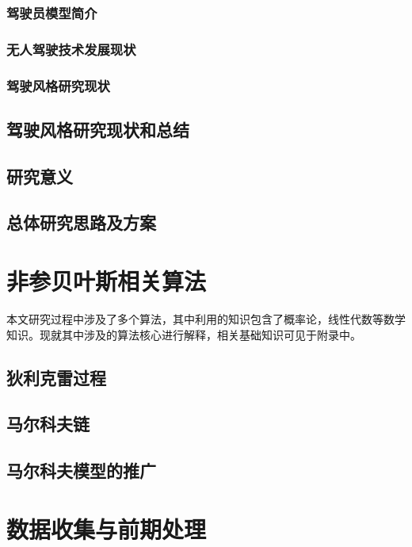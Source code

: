 \documentclass[a4paper,twoside]{article}
\theoremstyle{definition} \newtheorem{law}[thm]{Law}
\theoremstyle{plain} \newtheorem{jury}[thm]{Jury}
\theoremstyle{remark} \newtheorem*{marg}{Margaret}
\begin{document}
\subsubsection{驾驶员模型简介}


\subsubsection{无人驾驶技术发展现状}%


\subsubsection{驾驶风格研究现状}%


\subsection{驾驶风格研究现状和总结}%


\subsection{研究意义}\label{sec:youhao}



\subsection{总体研究思路及方案}%

\section{非参贝叶斯相关算法}
本文研究过程中涉及了多个算法，其中利用的知识包含了概率论，线性代数等数学知识。现就其中涉及的算法核心进行解释，相关基础知识可见于附录中。
\subsection{狄利克雷过程}

\subsection{马尔科夫链}


\subsection{马尔科夫模型的推广}


\section{数据收集与前期处理}
\end{document}
